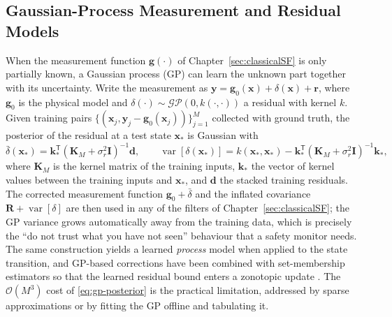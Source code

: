 \subsection{Gaussian-Process Measurement and Residual Models}
\label{subsec:gp-models}
When the measurement function $\mathbf{g}(\cdot)$ of Chapter~\ref{sec:classicalSF} is only partially known, a Gaussian process (GP) \cite{rasmussen2006_gp} can learn the unknown part together with its uncertainty. Write the measurement as $\mathbf{y}=\mathbf{g}_0(\mathbf{x})+\delta(\mathbf{x})+\mathbf{r}$, where $\mathbf{g}_0$ is the physical model and $\delta(\cdot)\sim\mathcal{GP}(0,k(\cdot,\cdot))$ a residual with kernel $k$. Given training pairs $\{(\mathbf{x}_j,\mathbf{y}_j-\mathbf{g}_0(\mathbf{x}_j))\}_{j=1}^{M}$ collected with ground truth, the posterior of the residual at a test state $\mathbf{x}_*$ is Gaussian with
\begin{equation}
\bar{\delta}(\mathbf{x}_*)=\mathbf{k}_*^{\mathsf T}(\mathbf{K}_{M}+\sigma_r^{2}\mathbf{I})^{-1}\mathbf{d},\qquad
\operatorname{var}[\delta(\mathbf{x}_*)]=k(\mathbf{x}_*,\mathbf{x}_*)-\mathbf{k}_*^{\mathsf T}(\mathbf{K}_{M}+\sigma_r^{2}\mathbf{I})^{-1}\mathbf{k}_*,
\label{eq:gp-posterior}
\end{equation}
where $\mathbf{K}_{M}$ is the kernel matrix of the training inputs, $\mathbf{k}_*$ the vector of kernel values between the training inputs and $\mathbf{x}_*$, and $\mathbf{d}$ the stacked training residuals. The corrected measurement function $\mathbf{g}_0+\bar{\delta}$ and the inflated covariance $\mathbf{R}+\operatorname{var}[\delta]$ are then used in any of the filters of Chapter~\ref{sec:classicalSF}; the GP variance grows automatically away from the training data, which is precisely the ``do not trust what you have not seen'' behaviour that a safety monitor needs. The same construction yields a learned \emph{process} model when applied to the state transition, and GP-based corrections have been combined with set-membership estimators so that the learned residual bound enters a zonotopic update \cite{li2022_gp_zkf}. The $\mathcal{O}(M^{3})$ cost of \eqref{eq:gp-posterior} is the practical limitation, addressed by sparse approximations or by fitting the GP offline and tabulating it.

